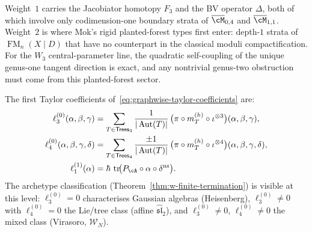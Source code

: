 \begin{remark}
\label{rem:vol1-first-genuinely-modular}
Weight~$1$ carries the Jacobiator homotopy $F_3$ and the BV
operator $\Delta$, both of which involve only codimension-one
boundary strata of $\overline{\cM}_{0,4}$ and
$\overline{\cM}_{1,1}$.  Weight~$2$ is where Mok's rigid
planted-forest types first enter: depth-$1$ strata of
$\operatorname{FM}_n(X\mathbin{|}D)$ that have no counterpart in
the classical moduli compactification.  For the $W_3$
central-parameter line, the quadratic self-coupling of the unique
genus-one tangent direction is exact, and any nontrivial genus-two
obstruction must come from this planted-forest sector.
\end{remark}

\begin{computation}
\label{comp:vol1-low-genus-log-fm-chart}
The first Taylor coefficients
of~\eqref{eq:graphwise-taylor-coefficients} are:
\begin{align*}
\ell_3^{(0)}(\alpha,\beta,\gamma)
&=
\sum_{T\in\mathsf{Trees}_3}
\frac{1}{|\operatorname{Aut}(T)|}\,
\bigl(\pi\circ m_T^{(h)}\circ \iota^{\otimes 3}\bigr)
(\alpha,\beta,\gamma),\\
\ell_4^{(0)}(\alpha,\beta,\gamma,\delta)
&=
\sum_{T\in\mathsf{Trees}_4}
\frac{\pm1}{|\operatorname{Aut}(T)|}\,
\bigl(\pi\circ m_T^{(h)}\circ \iota^{\otimes 4}\bigr)
(\alpha,\beta,\gamma,\delta),\\
\ell_1^{(1)}(\alpha)
&=
\hbar\,\operatorname{tr}\!\bigl(
P_\cA\circ \alpha\circ \delta^{\mathrm{ns}}\bigr).
\end{align*}
The archetype classification
(Theorem~\ref{thm:w-finite-termination})
is visible at this level: $\ell_3^{(0)}=0$ characterises
Gaussian algebras (Heisenberg),
$\ell_3^{(0)}\neq0$ with $\ell_4^{(0)}=0$ the Lie/tree class
(affine $\widehat{\mathfrak{sl}}_2$), and
$\ell_3^{(0)}\neq0$, $\ell_4^{(0)}\neq0$ the mixed class
(Virasoro, $\mathcal{W}_N$).
\end{computation}

